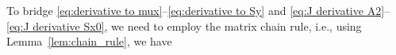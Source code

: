 To bridge \eqref{eq:derivative to mux}--\eqref{eq:derivative to Sy}  
and \eqref{eq:J derivative A2}--\eqref{eq:J derivative Sx0}, we need to employ the matrix chain rule, i.e., using Lemma~\ref{lem:chain_rule}, we have
